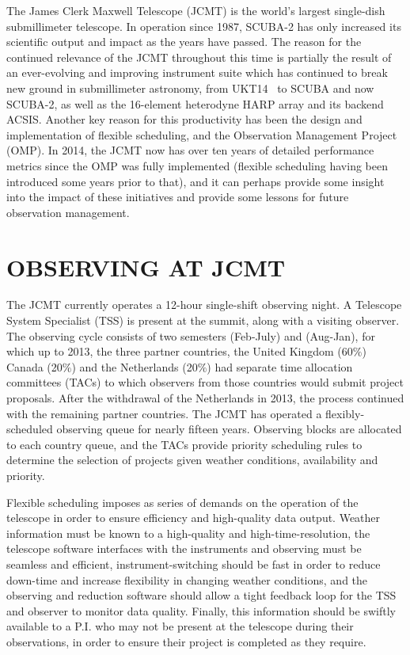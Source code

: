 \documentclass[]{spie}  %
\begin{document}
The James Clerk Maxwell Telescope (JCMT) is the world's largest
single-dish submillimeter telescope. In operation since 1987, SCUBA-2
has only increased its scientific output and impact as the years have
passed. The reason for the continued relevance of the JCMT throughout
this time is partially the result of an ever-evolving and improving
instrument suite which has continued to break new ground in
submillimeter astronomy, from UKT14~\cite{1990MNRAS.243..126D} to SCUBA \cite{holland1999}
and now SCUBA-2\cite{holland2013}, as well as the 16-element heterodyne
HARP array\cite{buckle} and its backend ACSIS\cite{2000SPIE.4015..114H}. Another key
reason for this productivity has been the design and implementation of
flexible scheduling\cite{1998SPIE.3349..126W,tilanus2000,robson2002}, and the Observation
Management Project (OMP)\cite{economou2002}.  In 2014, the JCMT now
has over ten years of detailed performance metrics since the OMP was
fully implemented (flexible scheduling having been introduced some
years prior to that), and it can perhaps provide some insight into the
impact of these initiatives and provide some lessons for future
observation management.


\section{OBSERVING AT JCMT}

The JCMT currently operates a 12-hour single-shift observing night. A
Telescope System Specialist (TSS) is present at the summit, along with
a visiting observer. The observing cycle consists of two semesters
(Feb-July) and (Aug-Jan), for which up to 2013, the three partner
countries, the United Kingdom (60$\%$) Canada (20$\%$) and the
Netherlands (20$\%$) had separate time allocation committees (TACs) to
which observers from those countries would submit project
proposals. After the withdrawal of the Netherlands in 2013, the
process continued with the remaining partner countries. The JCMT has
operated a flexibly-scheduled observing queue for nearly fifteen
years. Observing blocks are allocated to each country queue, and the
TACs provide priority scheduling rules to determine the selection of
projects given weather conditions, availability and priority.

Flexible scheduling imposes as series of demands on the operation of
the telescope in order to ensure efficiency and high-quality data
output. Weather information must be known to a high-quality and
high-time-resolution, the telescope software interfaces with the
instruments and observing must be seamless and efficient,
instrument-switching should be fast in order to reduce down-time and
increase flexibility in changing weather conditions, and the observing
and reduction software should allow a tight feedback loop for the TSS
and observer to monitor data quality. Finally, this information should
be swiftly available to a P.I. who may not be present at the telescope
during their observations, in order to ensure their project is
completed as they require.
\end{document}
